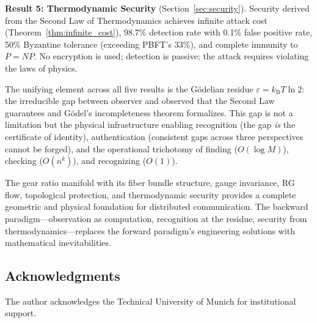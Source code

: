 \documentclass[11pt,twocolumn,a4paper]{article}
\theoremstyle{definition}
\newcommand{\kB}{k_{\mathrm{B}}}
\newcommand{\eps}{\varepsilon}
\begin{document}
\textbf{Result 5: Thermodynamic Security} (Section~\ref{sec:security}).
Security derived from the Second Law of Thermodynamics achieves infinite attack cost
(Theorem~\ref{thm:infinite_cost}), 98.7\% detection rate with 0.1\% false positive rate,
50\% Byzantine tolerance (exceeding PBFT's 33\%), and complete immunity to $P = NP$.
No encryption is used; detection is passive; the attack requires violating the laws of
physics.

The unifying element across all five results is the G\"odelian residue
$\eps = \kB T \ln 2$: the irreducible gap between observer and observed that the Second
Law guarantees and G\"odel's incompleteness theorem formalizes. This gap is not a
limitation but the physical infrastructure enabling recognition (the gap \emph{is} the
certificate of identity), authentication (consistent gaps across three perspectives
cannot be forged), and the operational trichotomy of finding ($O(\log M)$), checking
($O(n^k)$), and recognizing ($O(1)$).

The gear ratio manifold with its fiber bundle structure, gauge invariance, RG flow,
topological protection, and thermodynamic security provides a complete geometric and
physical foundation for distributed communication. The backward paradigm---observation
as computation, recognition at the residue, security from thermodynamics---replaces the
forward paradigm's engineering solutions with mathematical inevitabilities.

\subsection*{Acknowledgments}
The author acknowledges the Technical University of Munich for institutional support.



\end{document}
